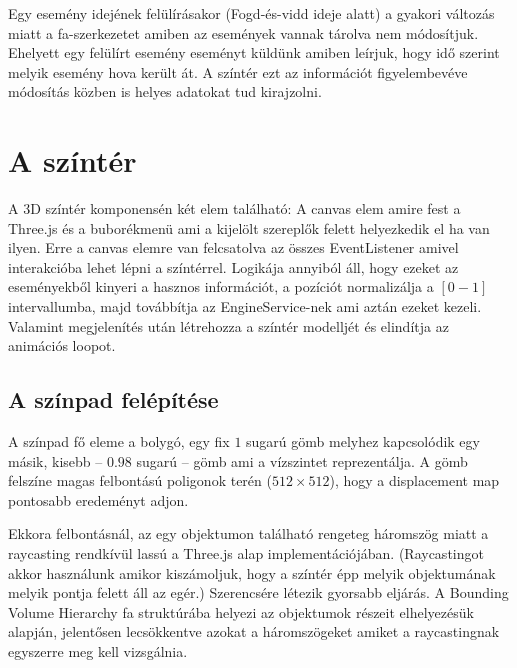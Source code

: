 Egy esemény idejének felülírásakor (Fogd-és-vidd ideje alatt) a gyakori változás miatt a fa-szerkezetet amiben az események vannak tárolva nem módosítjuk. Ehelyett egy felülírt esemény eseményt küldünk amiben leírjuk, hogy idő szerint melyik esemény hova került át. A színtér ezt az információt figyelembevéve módosítás közben is helyes adatokat tud kirajzolni.

\section{A színtér}

A 3D színtér komponensén két elem található: A canvas elem amire fest a Three.js és a buborékmenü ami a kijelölt szereplők felett helyezkedik el ha van ilyen. Erre a canvas elemre van felcsatolva az összes EventListener amivel interakcióba lehet lépni a színtérrel. Logikája annyiból áll, hogy ezeket az eseményekből kinyeri a hasznos információt, a pozíciót normalizálja a $[0-1]$ intervallumba, majd továbbítja az EngineService-nek ami aztán ezeket kezeli. Valamint megjelenítés után létrehozza a színtér modelljét és elindítja az animációs loopot.

\subsection{A színpad felépítése}

A színpad fő eleme a bolygó, egy fix $1$ sugarú gömb melyhez kapcsolódik egy másik, kisebb -- $0.98$ sugarú -- gömb ami a vízszintet reprezentálja. A gömb felszíne magas felbontású poligonok terén ($512×512$), hogy a displacement map \cite{Displacement} pontosabb eredeményt adjon.

Ekkora felbontásnál, az egy objektumon található rengeteg háromszög miatt a raycasting \cite{Raycast} rendkívül lassú a Three.js alap implementációjában. (Raycastingot akkor használunk amikor kiszámoljuk, hogy a színtér épp melyik objektumának melyik pontja felett áll az egér.) Szerencsére létezik gyorsabb eljárás. A Bounding Volume Hierarchy \cite{BVH} fa struktúrába helyezi az objektumok részeit elhelyezésük alapján, jelentősen lecsökkentve azokat a háromszögeket amiket a raycastingnak egyszerre meg kell vizsgálnia.

